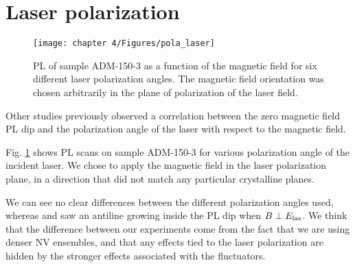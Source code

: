 \documentclass[a4paper, 11pt]{report}
\begin{document}
\section{Laser polarization}
\begin{figure}[h]
\centering
\texttt{[image: chapter 4/Figures/pola\_laser]}
\caption{PL of sample ADM-150-3 as a function of the magnetic field for six different laser polarization angles. The magnetic field orientation was chosen arbitrarily in the plane of polarization of the laser field.}
\label{pola laser}
\end{figure}

Other studies \citep{anishchik2015low, filimonenko2020weak} previously observed a correlation between the zero magnetic field PL dip and the polarization angle of the laser with respect to the magnetic field. 

Fig. \ref{pola laser} shows PL scans on sample ADM-150-3 for various polarization angle of the incident laser. We chose to apply the magnetic field in the laser polarization plane, in a direction that did not match any particular crystalline planes.

We can see no clear differences between the different polarization angles used, whereas \citep{anishchik2015low} and \citep{filimonenko2020weak} saw an antiline growing inside the PL dip when $B \perp E_{\rm las}$. We think that the difference between our experiments come from the fact that we are using denser NV ensembles, and that any effects tied to the laser polarization are hidden by the stronger effects associated with the fluctuators.

\printbibliography
\end{document}
